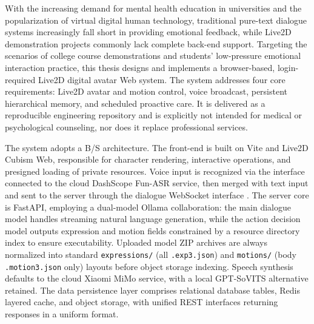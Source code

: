 \documentclass{base}
\begin{document}
\begin{enabstract}
    With the increasing demand for mental health education in universities and the popularization of virtual digital human technology, traditional pure-text dialogue systems increasingly fall short in providing emotional feedback, while Live2D demonstration projects commonly lack complete back-end support. Targeting the scenarios of college course demonstrations and students' low-pressure emotional interaction practice, this thesis designs and implements a browser-based, login-required Live2D digital avatar Web system. The system addresses four core requirements: Live2D avatar and motion control, voice broadcast, persistent hierarchical memory, and scheduled proactive care. It is delivered as a reproducible engineering repository and is explicitly not intended for medical or psychological counseling, nor does it replace professional services.

    The system adopts a B/S architecture. The front-end is built on Vite and Live2D Cubism Web, responsible for character rendering, interactive operations, and presigned loading of private resources. Voice input is recognized via the  interface connected to the cloud DashScope Fun-ASR service, then merged with text input and sent to the server through the dialogue WebSocket interface . The server core is FastAPI, employing a dual-model Ollama collaboration: the main dialogue model handles streaming natural language generation, while the action decision model outputs expression and motion fields constrained by a resource directory index to ensure executability. Uploaded model ZIP archives are always normalized into standard \texttt{expressions/} (all \texttt{.exp3.json}) and \texttt{motions/} (body \texttt{.motion3.json} only) layouts before object storage indexing. Speech synthesis defaults to the cloud Xiaomi MiMo service, with a local GPT-SoVITS alternative retained. The data persistence layer comprises relational database tables, Redis layered cache, and object storage, with unified REST interfaces returning responses in a uniform format.


\end{enabstract}
\end{document}
